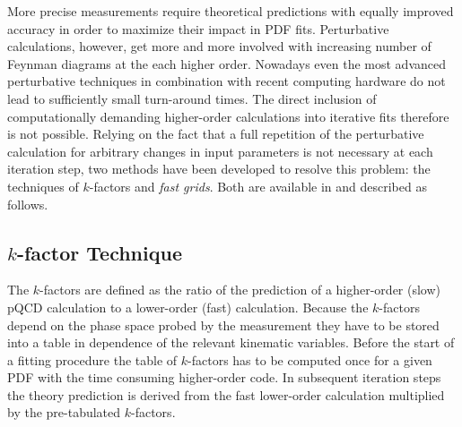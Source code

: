More precise measurements
require theoretical predictions with equally improved accuracy in
order to maximize their impact in PDF fits.  Perturbative
calculations, however, get more and more involved with increasing
number of Feynman diagrams at the each higher order. 
Nowadays even the most advanced perturbative techniques in
combination with recent computing hardware do not lead to sufficiently
small turn-around times. The direct inclusion of computationally
demanding higher-order calculations into iterative fits therefore is
not possible. Relying on the fact that a full repetition of the
perturbative calculation for arbitrary changes in input parameters is
not necessary at each iteration step, two methods have been developed
to resolve this problem: the techniques of $k$-factors and
\emph{fast grids}. Both are available in \fitter and described as follows.

\subsection{$k$-factor Technique}
  The $k$-factors are defined as the ratio of the prediction of a
  higher-order (slow) pQCD calculation to a lower-order (fast)
  calculation. Because the $k$-factors depend on the phase space
  probed by the measurement they have to be stored into a table in
  dependence of the relevant kinematic variables. Before the start of
  a fitting procedure the table of $k$-factors has to be computed once
  for a given PDF with the time consuming higher-order code. In
  subsequent iteration steps the theory prediction is derived from the
  fast lower-order calculation multiplied by the pre-tabulated
  $k$-factors.

